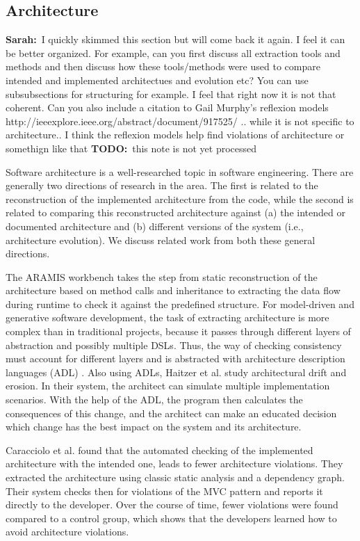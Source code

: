 \documentclass[sigplan, anonymous, review]{acmart}
\newcommand{\sn}[1]{{\color{blue}\textbf{Sarah:}~#1}}
\newcommand{\todo}[1]{{ \color{red} \textbf{TODO:}~#1}}
\begin{document}
\subsection{Architecture}
\label{sec:relwork-arch}

\sn{I quickly skimmed this section but will come back it again. I feel it can be better organized. For example, can you first discuss all extraction tools and methods and then discuss how these tools/methods were used to compare intended and implemented architectues and evolution etc? You can use subsubsections for structuring for example. I feel that right  now it is not that coherent. Can you also include a citation to Gail Murphy's reflexion models http://ieeexplore.ieee.org/abstract/document/917525/ .. while it is not specific to architecture.. I think the reflexion models help find violations of architecture or somethign like that} \todo{this note is not yet processed}

Software architecture is a well-researched topic in software engineering.
There are generally two directions of research in the area.
The first is related to the reconstruction of the implemented architecture from the code, while the second is related to comparing this reconstructed architecture against (a) the intended or documented architecture and (b) different versions of the system (i.e., architecture evolution).
We discuss related work from both these general directions.

The ARAMIS workbench \cite{Aramis} takes the step from static reconstruction of the architecture based on method calls and inheritance to extracting the data flow during runtime to check it against the predefined structure. 
For model-driven and generative software development, the task of extracting architecture is more complex than in traditional projects, because it passes through different layers of abstraction and possibly multiple DSLs. 
Thus, the way of checking consistency must account for different layers and is abstracted with architecture description languages (ADL) \cite{ArcCons,Arc-MDSE}. 
Also using ADLs, Haitzer et al. \cite{Arc-Decision} study architectural drift and erosion. In their system, the architect can simulate multiple implementation scenarios. With the help of the ADL, the program then calculates the consequences of this change, and the architect can make an educated decision which change has the best impact on the system and its architecture. 

Caracciolo et al. \cite{ArcConf} found that the automated checking of the implemented architecture with the intended one, leads to fewer architecture violations. They extracted the architecture using classic static analysis and a dependency graph. Their system checks then for violations of the MVC pattern and reports it directly to the developer. Over the course of time, fewer violations were found compared to a control group, which shows that the developers learned how to avoid architecture violations.
\end{document}
